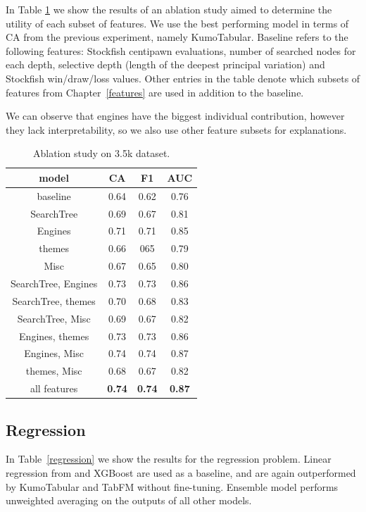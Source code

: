 \documentclass[sigconf,nonacm]{acmart}
\begin{document}
In Table \ref{class} we show the results of an ablation study aimed to determine the utility of each subset of features. We use the best performing model in terms of CA from the previous experiment, namely KumoTabular. Baseline refers to the following features: Stockfish centipawn evaluations, number of searched nodes for each depth, selective depth (length of the deepest principal variation) and Stockfish win/draw/loss values. Other entries in the table denote which subsets of features from Chapter~\ref{features} are used in addition to the baseline. 

We can observe that engines have the biggest individual contribution, however they lack interpretability, so we also use other feature subsets for explanations. 

\begin{center}
\begin{table}[!ht]
\caption{Ablation study on 3.5k dataset.
\label{class}}
\centering
{\begin{tabular}{c|c|c|c}
model & CA & F1 & AUC \\ \hline
baseline & 0.64 & 0.62 & 0.76 \\
SearchTree & 0.69 & 0.67 & 0.81 \\
Engines & 0.71 & 0.71 & 0.85 \\
themes & 0.66 & 065 & 0.79 \\
Misc & 0.67 & 0.65 & 0.80 \\
SearchTree, Engines & 0.73 & 0.73 & 0.86  \\
SearchTree, themes & 0.70 & 0.68 & 0.83  \\
SearchTree, Misc & 0.69 & 0.67 & 0.82 \\
Engines, themes & 0.73 & 0.73 & 0.86 \\
Engines, Misc & 0.74 & 0.74 & 0.87 \\
themes, Misc & 0.68 & 0.67 & 0.82 \\
all features & \textbf{0.74} & \textbf{0.74} & \textbf{0.87} \\
\end{tabular}}
\end{table}
\end{center}

\subsection{Regression}

In Table~\ref{regression} we show the results for the regression problem. Linear regression from \cite{scikit} and XGBoost \cite{xgboost} are used as a baseline, and are again outperformed by KumoTabular \cite{kumo} and TabFM \cite{tabfm} without fine-tuning. Ensemble model performs unweighted averaging on the outputs of all other models. 
\end{document}
